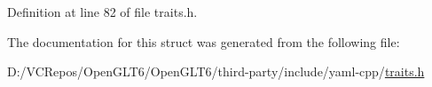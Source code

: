 Definition at line 82 of file traits.\+h.



The documentation for this struct was generated from the following file\+:\begin{DoxyCompactItemize}
\item 
D\+:/\+V\+C\+Repos/\+Open\+G\+L\+T6/\+Open\+G\+L\+T6/third-\/party/include/yaml-\/cpp/\mbox{\hyperlink{traits_8h}{traits.\+h}}\end{DoxyCompactItemize}
